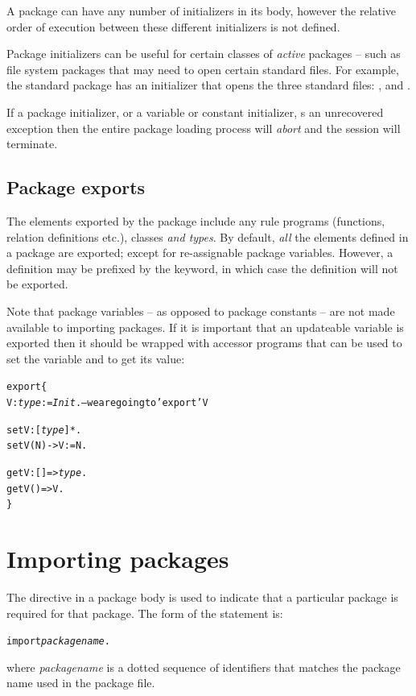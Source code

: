 A package can have any number of initializers in its body, however the relative order of execution between these different initializers is not defined.

Package initializers can be useful for certain classes of \emph{active} packages -- such as file system packages that may need to open certain standard files. For example, the  standard package has an initializer that opens the three standard files: ,  and .

\begin{aside}
If a package initializer, or a variable or constant initializer, s an unrecovered exception then the entire package loading process will \emph{abort} and the \go session will terminate.
\end{aside}

\subsection{Package exports}
\label{package:export}

The elements exported by the package include any rule programs (functions, relation definitions etc.), classes \emph{and types}. By default, \emph{all} the elements defined in a package are exported; except for re-assignable package variables. However, a definition may be prefixed by the  keyword, in which case the definition will not be exported.
\begin{aside}
Note that package variables -- as opposed to package constants -- are not made available to importing packages. If it is important that an updateable variable is exported then it should be wrapped with accessor programs that can be used to set the variable and to get its value:
\begin{alltt}
export\{
  V:\emph{type} := \emph{Init}.  -- we are going to 'export' V
  
  setV:[\emph{type}]*.
  setV(N) -> V := N.
    
  getV:[]=>\emph{type}.
  getV() => V.
\}
\end{alltt}
\end{aside}

\section{Importing packages}
\label{package:import}
The  directive in a package body is used to indicate that a particular package is required for that package. The form of the  statement is:
\begin{alltt}
import \emph{packagename}.
\end{alltt}
where \emph{packagename} is a dotted sequence of identifiers that matches the package name used in the package file. 

